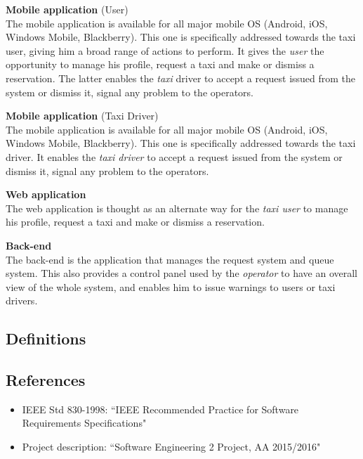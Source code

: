 \begin{enumerate} [label = \textbf{[APP\arabic*]}]
  \item \textbf{Mobile application} (User) \hfill \\
  \label{app:mobileuser}
  The mobile application is available for all major mobile OS (Android, iOS, Windows Mobile, Blackberry).
  This one is specifically addressed towards the taxi user, giving him a broad range of actions to perform.
  It gives the \emph{user} the opportunity to manage his profile, request a taxi and make or dismiss a reservation. %
  The latter enables the \emph{taxi} driver to accept a request issued from the system or dismiss it, signal any problem to the operators.

  \item \textbf{Mobile application} (Taxi Driver) \hfill \\
  \label{app:mobiledriver}
  The mobile application is available for all major mobile OS (Android, iOS, Windows Mobile, Blackberry).
  This one is specifically addressed towards the taxi driver.
  It enables the \emph{taxi driver} to accept a request issued from the system or dismiss it, signal any problem to the operators.

  \item \textbf{Web application} \hfill \\
  \label{app:web}
  The web application is thought as an alternate way for the \emph{taxi user} to manage his profile, request a taxi and make or dismiss a reservation.

  \item \textbf{Back-end} \hfill \\
  \label{app:backend}
  The back-end is the application that manages the request system and queue system. This also provides a control panel used by the \emph{operator} to have an overall view of the whole system, and enables him to issue warnings to users or taxi drivers.
\end{enumerate}

\subsection{Definitions}

\subsection{References}
\begin{itemize}
\item IEEE Std 830-1998: ``IEEE Recommended Practice for Software Requirements Specifications"
\item Project description: ``Software Engineering 2 Project, AA 2015/2016"
\end{itemize}

